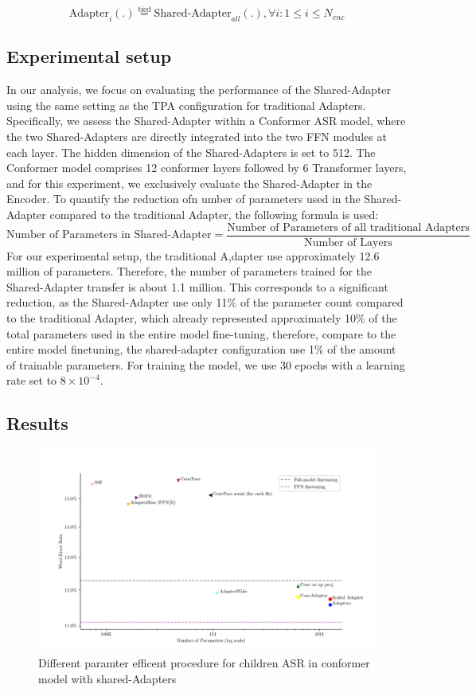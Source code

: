 \begin{equation}
    \text{Adapter}_{i}(.) \stackrel{\text{tied}}{=} \text{Shared-Adapter}_{all}(.) , \forall i: 1 \leq i \leq N_{enc}
\end{equation}

\subsection{Experimental setup}
In our analysis, we focus on evaluating the performance of the Shared-Adapter using the same setting as the TPA configuration for traditional Adapters. Specifically, we assess the Shared-Adapter within a Conformer ASR model, where the two Shared-Adapters are directly integrated into the two FFN modules at each layer. The hidden dimension of the Shared-Adapters is set to 512. The Conformer model comprises 12 conformer layers followed by 6 Transformer layers, and for this experiment, we exclusively evaluate the Shared-Adapter in the Encoder.
To quantify the reduction ofn umber of parameters used in the Shared-Adapter compared to the traditional Adapter, the following formula is used:
\begin{equation}
    \text{Number of Parameters in Shared-Adapter} = \frac{\text{Number of Parameters of all traditional Adapters}}{\text{Number of Layers}}
\end{equation}
For our experimental setup, the traditional A,dapter use approximately 12.6 million of parameters. Therefore, the number of parameters trained for the Shared-Adapter transfer is about 1.1 million. This corresponds to a significant reduction, as the Shared-Adapter use only 11\% of the parameter count compared to the traditional Adapter, which already represented approximately 10\% of the total parameters used in the entire model fine-tuning, therefore, compare to the entire model finetuning, the shared-adapter configuration use 1\% of the amount of trainable parameters.
For training the model, we use 30 epochs with a learning rate set to $8 \times 10^{-4}$. 

\subsection{Results}

\begin{figure}
    \begin{center}
        \includegraphics[width=\textwidth]{imgs/Adapters_compare.png}
        \caption{Different paramter efficent procedure for children ASR in conformer model with shared-Adapters}
        \label{fig:adapter_compared}
    \end{center}
\end{figure}
